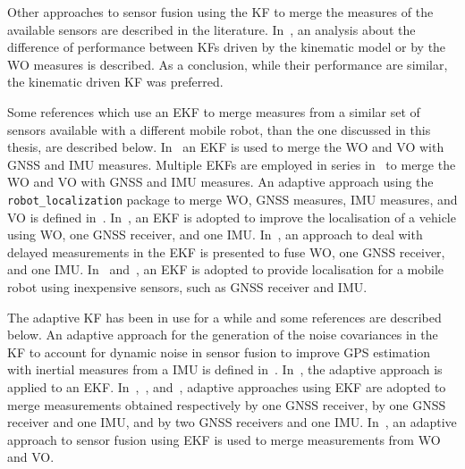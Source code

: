 Other approaches to sensor fusion using the \gls{KF} to merge the measures of the available sensors are described in the literature.
In~\cite{801027}, an analysis about the difference of performance between \glspl{KF} driven by the  kinematic model or by the \gls{WO} measures is described. As a conclusion, while their performance are similar, the kinematic driven \gls{KF} was preferred.


Some references which use an \gls{EKF} to merge measures from a similar set of sensors available with a different mobile robot, than the one discussed in this thesis, are described below.
In~\cite{9024731} an \gls{EKF} is used to merge the \gls{WO} and \gls{VO} with \gls{GNSS} and \gls{IMU} measures.
Multiple \glspl{EKF} are employed in series in~\cite{9075286} to merge the \gls{WO} and \gls{VO} with \gls{GNSS} and \gls{IMU} measures.
An adaptive approach using the \texttt{robot\_localization} package to merge \gls{WO}, \gls{GNSS} measures, \gls{IMU} measures, and \gls{VO} is defined in~\cite{CHEN1298238}.
In~\cite{magnusson_improving_2012}, an \gls{EKF} is adopted to improve the localisation of a vehicle using \gls{WO}, one \gls{GNSS} receiver, and one \gls{IMU}.
In~\cite{8c506f630d4e478dace903637fa0a75b}, an approach to deal with delayed measurements in the \gls{EKF} is presented to fuse \gls{WO}, one \gls{GNSS} receiver, and one \gls{IMU}.
In~\cite{king_low_2008} and~\cite{skog2005low}, an \gls{EKF} is adopted to provide localisation for a mobile robot using inexpensive sensors, such as \gls{GNSS} receiver and \gls{IMU}.

The adaptive \gls{KF} has been in use for a while and some references are described below.
An adaptive approach for the generation of the noise covariances in the \gls{KF} to account for dynamic noise in sensor fusion to improve \gls{GPS} estimation with inertial measures from a \gls{IMU} is defined in~\cite{mohamed1999adaptive}.
In~\cite{grandoni_sensor_2001}, the adaptive approach is applied to an \gls{EKF}.
In~\cite{kong_using_2012},~\cite{Werries-2016-5519}, and~\cite{hao_modified_2018}, adaptive approaches using \gls{EKF} are adopted to merge measurements obtained respectively by one \gls{GNSS} receiver, by one \gls{GNSS} receiver and one \gls{IMU}, and by two \gls{GNSS} receivers and one \gls{IMU}.
In~\cite{chenavier_position_1992}, an adaptive approach to sensor fusion using \gls{EKF} is used to merge measurements from \gls{WO} and \gls{VO}.


